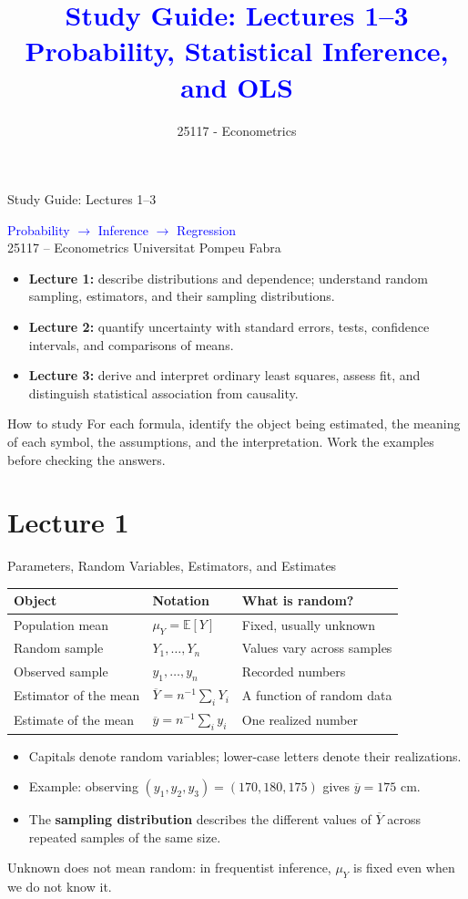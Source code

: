 \documentclass[10pt,aspectratio=169]{beamer}
\title[]{\textcolor{blue}{Study Guide: Lectures 1--3\\Probability, Statistical Inference, and OLS}}
\author{25117 - Econometrics}
\institute[shortinst]{Universitat Pompeu Fabra}
\date{}
\newcommand{\E}{\mathbb{E}}
\begin{document}
\begin{frame}{Study Guide: Lectures 1--3}
\begin{center}
{\Large\textcolor{blue}{Probability $\longrightarrow$ Inference $\longrightarrow$ Regression}}\\[.4cm]
25117 -- Econometrics \quad Universitat Pompeu Fabra
\end{center}
\begin{itemize}
\item \textbf{Lecture 1:} describe distributions and dependence; understand random sampling, estimators, and their sampling distributions.
\item \textbf{Lecture 2:} quantify uncertainty with standard errors, tests, confidence intervals, and comparisons of means.
\item \textbf{Lecture 3:} derive and interpret ordinary least squares, assess fit, and distinguish statistical association from causality.
\end{itemize}
\begin{block}{How to study}
For each formula, identify the object being estimated, the meaning of each symbol, the assumptions, and the interpretation. Work the examples before checking the answers.
\end{block}
\end{frame}

\section{Lecture 1}
\begin{frame}{Parameters, Random Variables, Estimators, and Estimates}
\begin{center}
\begin{tabular}{lll}
\toprule
Object & Notation & What is random?\\
\midrule
Population mean & $\mu_Y=\E[Y]$ & Fixed, usually unknown\\
Random sample & $Y_1,\ldots,Y_n$ & Values vary across samples\\
Observed sample & $y_1,\ldots,y_n$ & Recorded numbers\\
Estimator of the mean & $\overline Y=n^{-1}\sum_iY_i$ & A function of random data\\
Estimate of the mean & $\overline y=n^{-1}\sum_i y_i$ & One realized number\\
\bottomrule
\end{tabular}
\end{center}
\begin{itemize}
\item Capitals denote random variables; lower-case letters denote their realizations.
\item Example: observing $(y_1,y_2,y_3)=(170,180,175)$ gives $\overline y=175$ cm.
\item The \textbf{sampling distribution} describes the different values of $\overline Y$ across repeated samples of the same size.
\end{itemize}
Unknown does not mean random: in frequentist inference, $\mu_Y$ is fixed even when we do not know it.
\end{frame}
\end{document}

